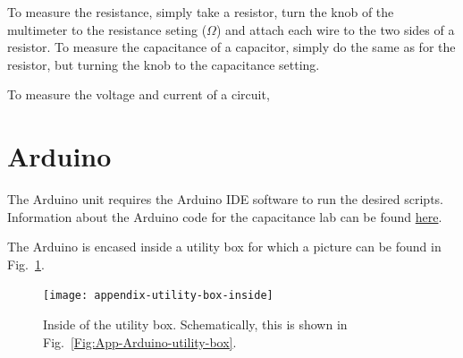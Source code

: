 \documentclass[12pt]{report}
\begin{document}
\begin{appendix}
To measure the resistance, simply take a resistor, turn the knob of the multimeter to the resistance seting ($\Omega$) and attach each wire to the two sides of a resistor. To measure the capacitance of a capacitor, simply do the same as for the resistor, but turning the knob to the capacitance setting.

To measure the voltage and current of a circuit,

\section{Arduino}
The Arduino unit requires the Arduino IDE software to run the desired scripts. Information about the Arduino code for the capacitance lab can be found \href{https://www.arduino.cc/en/Tutorial/CapacitanceMeter}{here}.

The Arduino is encased inside a utility box for which a picture can be found in Fig.~\ref{Fig:App-utility-box-inside}. 
\begin{figure}[h]
\centering
\texttt{[image: appendix-utility-box-inside]}
\caption{Inside of the utility box. Schematically, this is shown in Fig.~\ref{Fig:App-Arduino-utility-box}.}
\label{Fig:App-utility-box-inside}
\end{figure}


\end{appendix}
\end{document}
